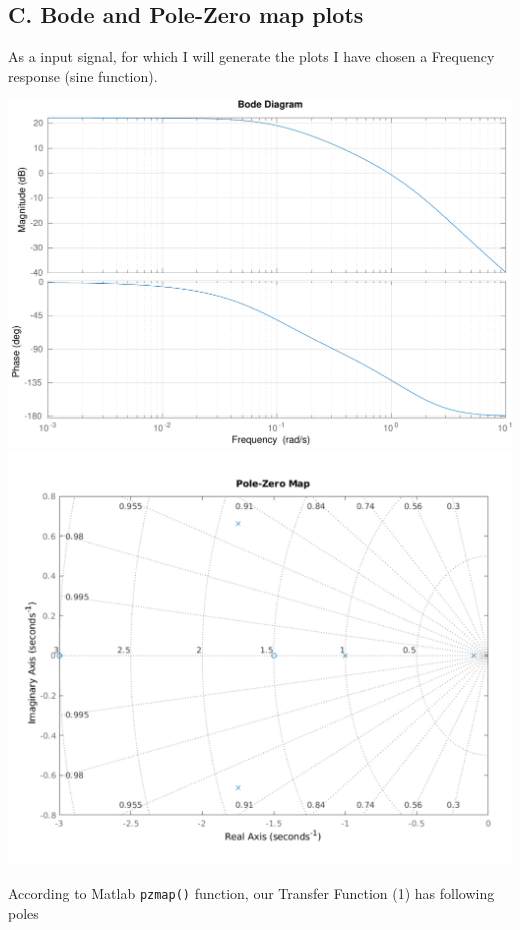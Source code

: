 \documentclass[a4paper,12pt]{article}
\begin{document}
    \subsection*{C. Bode and Pole-Zero map plots}
    As a input signal, for which I will generate the plots I have chosen 
    a Frequency response (sine function).
    \begin{center}
        \includegraphics[width=\linewidth]{../Task1/ToReport/T1Bode.pdf}\\
        \includegraphics[width=\linewidth]{../Task1/ToReport/T1PoleZero.pdf}        
    \end{center}
    According to Matlab \texttt{pzmap()} function, our Transfer Function (1) has following poles 
\end{document}
